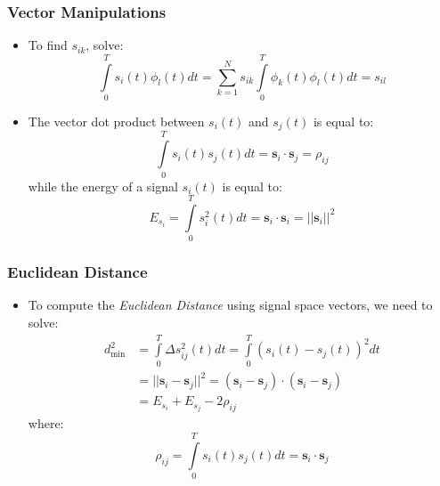 \documentclass{beamer}
\begin{document}
\frame
{
  \frametitle{Vector Manipulations}

    \begin{itemize}
        \item To find $s_{ik}$, solve:
        \begin{equation}
            \int\limits_0^Ts_i(t)\phi_l(t)dt=\sum\limits_{k=1}^{N}s_{ik}\int\limits_0^T\phi_k(t)\phi_l(t)dt=s_{il}
        \end{equation}
        \item The vector dot product between $s_i(t)$ and $s_j(t)$ is equal to:
        \begin{equation}
            \int\limits_0^Ts_i(t)s_j(t)dt=\mathbf{s}_i\cdot\mathbf{s}_j=\rho_{ij}
        \end{equation}
        while the energy of a signal $s_i(t)$ is equal to:
        \begin{equation}
            E_{s_i}=\int\limits_0^Ts_i^2(t)dt=\mathbf{s}_i\cdot\mathbf{s}_i=||\mathbf{s}_i||^2
        \end{equation}
    \end{itemize}
}
\frame
{
  \frametitle{Euclidean Distance}

    \begin{itemize}
        \item To compute the {\it Euclidean Distance} using signal space vectors, we need to solve:
        \begin{equation}
        \begin{split}
            d_{\min}^2&=\int\limits_0^T\Delta{s_{ij}^2(t)}dt=\int\limits_0^T(s_i(t)-s_j(t))^2dt\\
            &=||\mathbf{s}_i-\mathbf{s}_j||^2=(\mathbf{s}_i-\mathbf{s}_j)\cdot(\mathbf{s}_i-\mathbf{s}_j)\\
            &=E_{s_i}+E_{s_j}-2\rho_{ij}\nonumber
        \end{split}
        \end{equation}
        where:
        \begin{equation}
            \rho_{ij}=\int\limits_0^Ts_i(t)s_j(t)dt=\mathbf{s}_i\cdot\mathbf{s}_j
        \end{equation}
    \end{itemize}
}
\frame
\end{document}
